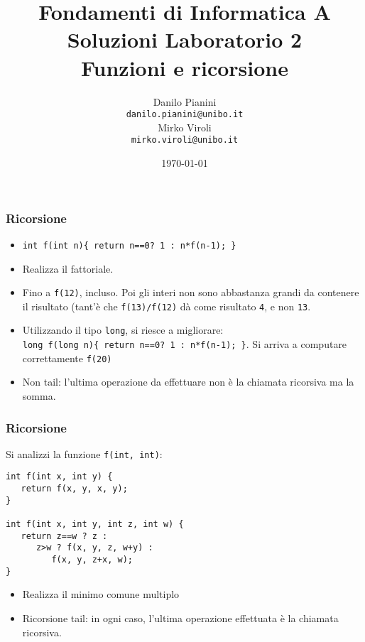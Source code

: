 \documentclass{beamer}
\begin{document}
\title[Lab1 - FV]{Fondamenti di Informatica A \\ Soluzioni Laboratorio 2 \\ Funzioni e ricorsione}
\author[Danilo Pianini]{Danilo Pianini\\\texttt{danilo.pianini@unibo.it} \\ \vspace{3pt} Mirko Viroli\\\texttt{mirko.viroli@unibo.it} }
\date[\today]{\today}

\frame{\titlepage} 

\begin{frame}
\frametitle{Ricorsione}
\begin{itemize}
 \item \texttt{int f(int n)\{ return n==0? 1 : n*f(n-1); \}}
\end{itemize}
\begin{itemize}
 \item Realizza il fattoriale.
 \item Fino a \texttt{f(12)}, incluso. Poi gli interi non sono abbastanza grandi da contenere il risultato (tant'è che \texttt{f(13)/f(12)} dà come risultato \texttt{4}, e non \texttt{13}.
 \item Utilizzando il tipo \texttt{long}, si riesce a migliorare: \\ \texttt{long f(long n)\{ return n==0? 1 : n*f(n-1); \}}. Si arriva a computare correttamente \texttt{f(20)}
 \item Non tail: l'ultima operazione da effettuare non è la chiamata ricorsiva ma la somma.
\end{itemize}
\end{frame}

\begin{frame}[fragile]
\frametitle{Ricorsione}
Si analizzi la funzione \texttt{f(int, int)}:
\begin{verbatim}
int f(int x, int y) {
   return f(x, y, x, y);
}

int f(int x, int y, int z, int w) {
   return z==w ? z :
      z>w ? f(x, y, z, w+y) :
         f(x, y, z+x, w);
}
\end{verbatim}
\begin{itemize}
 \item Realizza il minimo comune multiplo
 \item Ricorsione tail: in ogni caso, l'ultima operazione effettuata è la chiamata ricorsiva.
\end{itemize}
\end{frame}
\end{document}
